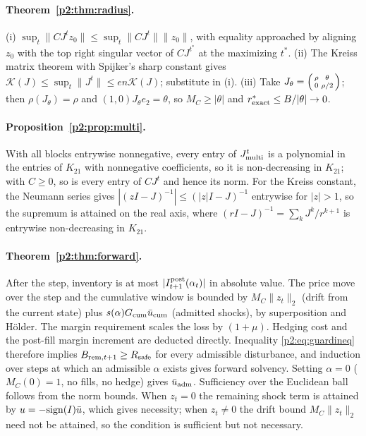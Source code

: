 \paragraph{Theorem~\ref{p2:thm:radius}.} (i) $\sup_t\|CJ^tz_0\|\le\sup_t\|CJ^t\|\|z_0\|$, with equality approached by aligning $z_0$ with the top right singular vector of $CJ^{t^*}$ at the maximizing $t^*$. (ii) The Kreiss matrix theorem with Spijker's sharp constant gives $\mathcal K(J)\le\sup_t\|J^t\|\le en\mathcal K(J)$; substitute in (i). (iii) Take $J_\theta=\begin{psmallmatrix}\rho&\theta\\0&\rho/2\end{psmallmatrix}$; then $\rho(J_\theta)=\rho$ and $(1,0)J_\theta e_2=\theta$, so $M_C\ge|\theta|$ and $r^*_{\rm exact}\le B/|\theta|\to0$.

\paragraph{Proposition~\ref{p2:prop:multi}.} With all blocks entrywise nonnegative, every entry of $J_{\rm multi}^t$ is a polynomial in the entries of $K_{21}$ with nonnegative coefficients, so it is non-decreasing in $K_{21}$; with $C\ge0$, so is every entry of $CJ^t$ and hence its norm. For the Kreiss constant, the Neumann series gives $|(zI-J)^{-1}|\le(|z|I-J)^{-1}$ entrywise for $|z|>1$, so the supremum is attained on the real axis, where $(rI-J)^{-1}=\sum_kJ^k/r^{k+1}$ is entrywise non-decreasing in $K_{21}$.

\paragraph{Theorem~\ref{p2:thm:forward}.} After the step, inventory is at most $|I^{\rm post}_{t+1}(\alpha_t)|$ in absolute value. The price move over the step and the cumulative window is bounded by $M_C\|z_t\|_2$ (drift from the current state) plus $s(\alpha)G_{\rm cum}\bar u_{\rm cum}$ (admitted shocks), by superposition and H\"older. The margin requirement scales the loss by $(1+\mu)$. Hedging cost and the post-fill margin increment are deducted directly. Inequality \eqref{p2:eq:guardineq} therefore implies $B_{{\rm rem},t+1}\ge R_{\rm safe}$ for every admissible disturbance, and induction over steps at which an admissible $\alpha$ exists gives forward solvency. Setting $\alpha=0$ ($M_C(0)=1$, no fills, no hedge) gives $\bar u_{\rm adm}$. Sufficiency over the Euclidean ball follows from the norm bounds. When $z_t=0$ the remaining shock term is attained by $u=-{\rm sign}(I)\bar u$, which gives necessity; when $z_t\ne0$ the drift bound $M_C\|z_t\|_2$ need not be attained, so the condition is sufficient but not necessary.

